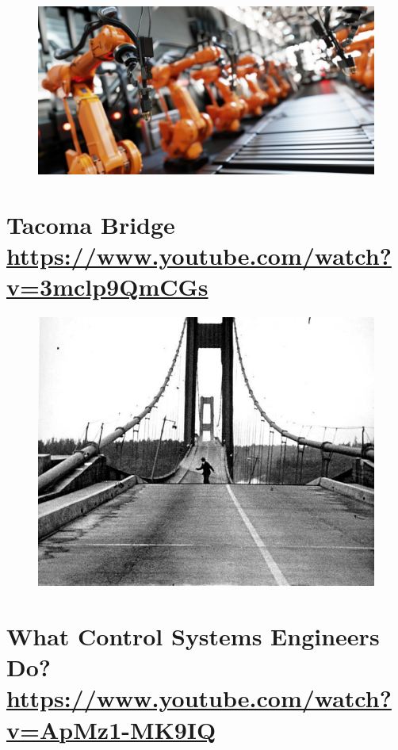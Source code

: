 \documentclass[
	12pt, %
]{fphw}
\begin{document}
\begin{figure}[H]
  \centering
  \includegraphics[scale=0.3]{images/automation.jpg}
\end{figure}

\newpage
\section*{{\color{RoyalPurple}Tacoma Bridge} \url{https://www.youtube.com/watch?v=3mclp9QmCGs}}

\begin{figure}[H]
  \centering
  \includegraphics[scale=0.3]{images/tacoma.jpg}
\end{figure}

\newpage
\section*{{\color{RoyalPurple}What Control Systems Engineers Do?} \url{https://www.youtube.com/watch?v=ApMz1-MK9IQ}}
\end{document}
